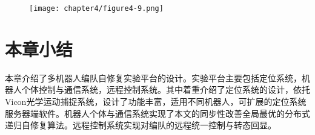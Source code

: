 \begin{figure}[!htbp]
	\centering
	\texttt{[image: chapter4/figure4-9.png]}
\end{figure}

\section{本章小结}
本章介绍了多机器人编队自修复实验平台的设计。实验平台主要包括定位系统，机器人个体控制与通信系统，远程控制系统。其中着重介绍了定位系统的设计，依托Vicon光学运动捕捉系统，设计了功能丰富，适用不同机器人，可扩展的定位系统服务器端软件。机器人个体与通信系统实现了本文的同步性改善全局最优的分布式递归自修复算法。远程控制系统实现对编队的远程统一控制与转态回显。
